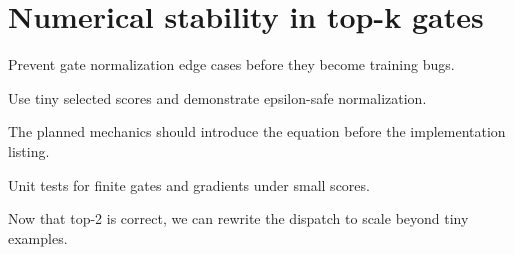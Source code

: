 \section{Numerical stability in top-k gates}
\label{sec:ch05-numerical-stability-in-top-k-gates}

Prevent gate normalization edge cases before they become training bugs.



Use tiny selected scores and demonstrate epsilon-safe normalization.



The planned mechanics should introduce the equation before the implementation listing.





\begin{checkpointbox}
Unit tests for finite gates and gradients under small scores.
\end{checkpointbox}

Now that top-2 is correct, we can rewrite the dispatch to scale beyond tiny examples.
